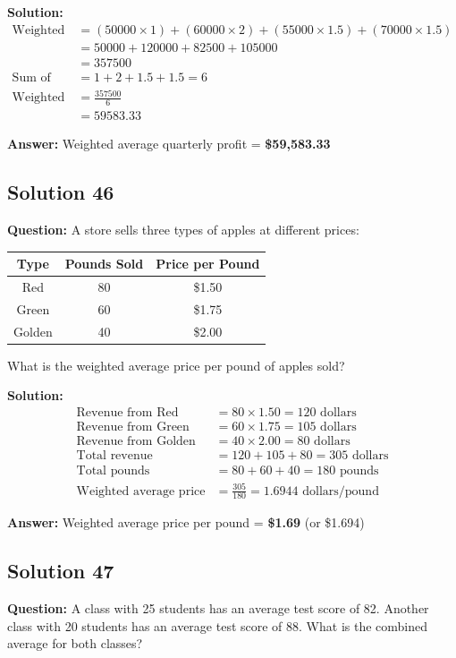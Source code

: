 \documentclass[12pt,a4paper]{article}
\begin{document}
\textbf{Solution:}
\begin{align*}
\text{Weighted Sum} &= (50000 \times 1) + (60000 \times 2) + (55000 \times 1.5) + (70000 \times 1.5) \\
&= 50000 + 120000 + 82500 + 105000 \\
&= 357500 \\
\text{Sum of weights} &= 1 + 2 + 1.5 + 1.5 = 6 \\
\text{Weighted average} &= \frac{357500}{6} \\
&= 59583.33
\end{align*}

\textbf{Answer:} Weighted average quarterly profit = \textbf{\$59,583.33}

\subsection*{Solution 46}
\textbf{Question:} A store sells three types of apples at different prices:
\begin{center}
\begin{tabular}{|c|c|c|}
\hline
Type & Pounds Sold & Price per Pound \\
\hline
Red & 80 & \$1.50 \\
Green & 60 & \$1.75 \\
Golden & 40 & \$2.00 \\
\hline
\end{tabular}
\end{center}
What is the weighted average price per pound of apples sold?

\textbf{Solution:}
\begin{align*}
\text{Revenue from Red} &= 80 \times 1.50 = 120 \text{ dollars} \\
\text{Revenue from Green} &= 60 \times 1.75 = 105 \text{ dollars} \\
\text{Revenue from Golden} &= 40 \times 2.00 = 80 \text{ dollars} \\
\text{Total revenue} &= 120 + 105 + 80 = 305 \text{ dollars} \\
\text{Total pounds} &= 80 + 60 + 40 = 180 \text{ pounds} \\
\text{Weighted average price} &= \frac{305}{180} = 1.694\text{4} \text{ dollars/pound}
\end{align*}

\textbf{Answer:} Weighted average price per pound = \textbf{\$1.69} (or \$1.694)

\subsection*{Solution 47}
\textbf{Question:} A class with 25 students has an average test score of 82. Another class with 20 students has an average test score of 88. What is the combined average for both classes?
\end{document}
